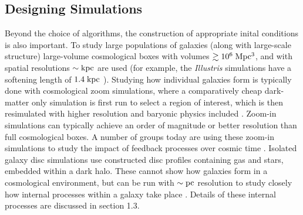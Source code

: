 \subsection{Designing Simulations}
Beyond the choice of algorithms, the construction of appropriate inital
conditions is also important.  To study large populations of galaxies (along
with large-scale structure) large-volume cosmological boxes with volumes
$\gtrsim 10^6\;\rm{Mpc^3}$, and with spatial resolutions $\sim \rm{kpc}$ are
used (for example, the {\it Illustris} simulations have a softening length of
$1.4\;\rm{kpc}$ \citep{Vogelsberger2014b}).  Studying how individual galaxies
form is typically done with cosmological zoom simulations, where a comparatively
cheap dark-matter only simulation is first run to select a region of interest,
which is then resimulated with higher resolution and baryonic physics included
\citep{Navarro1993}. Zoom-in simulations can typically achieve an order of
magnitude or better resolution than full cosmological boxes.  A number of groups
today are using these zoom-in simulations to study the impact of feedback
processes over cosmic time \citep{Stinson2013,Hopkins2014,Agertz2015}.  Isolated
galaxy disc simulations use constructed disc profiles containing gas and
stars, embedded within a dark halo. These cannot show how galaxies form in a
cosmological environment, but can be run with $\sim \rm{pc}$ resolution to study
closely how internal processes within a galaxy take place
\citep{Hopkins2011,Benincasa2016}.  Details of these internal processes are
discussed in section 1.3.

